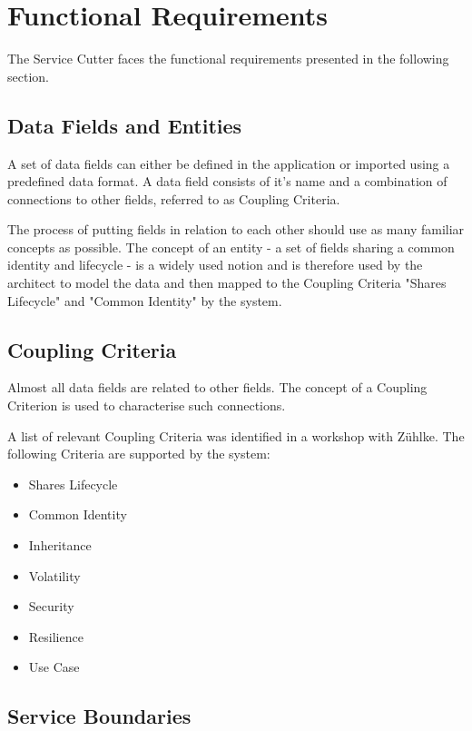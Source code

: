 \section{Functional Requirements}

The Service Cutter faces the functional requirements presented in the following
section.


\subsection{Data Fields and Entities}

A set of data fields can either be defined in the application or imported using a predefined data format. A data field consists of it's name and a combination of connections to other fields, referred to as Coupling Criteria.

The process of putting fields in relation to each other should use as many familiar concepts as possible. The concept of an entity - a set of fields sharing a common identity and lifecycle\cite{evans2003domain} - is a widely used notion and is therefore used by the architect to model the data and then mapped to the Coupling Criteria "Shares Lifecycle" and "Common Identity" by the system.

\subsection{Coupling Criteria}

Almost all data fields are related to other fields. The concept of a Coupling Criterion is used to characterise such connections.

A list of relevant Coupling Criteria was identified in a workshop with Zühlke. The following Criteria are supported by the system:

\begin{itemize}
	\item Shares Lifecycle
	\item Common Identity
	\item Inheritance
	\item Volatility
	\item Security
	\item Resilience
	\item Use Case
\end{itemize}


\subsection{Service Boundaries}

